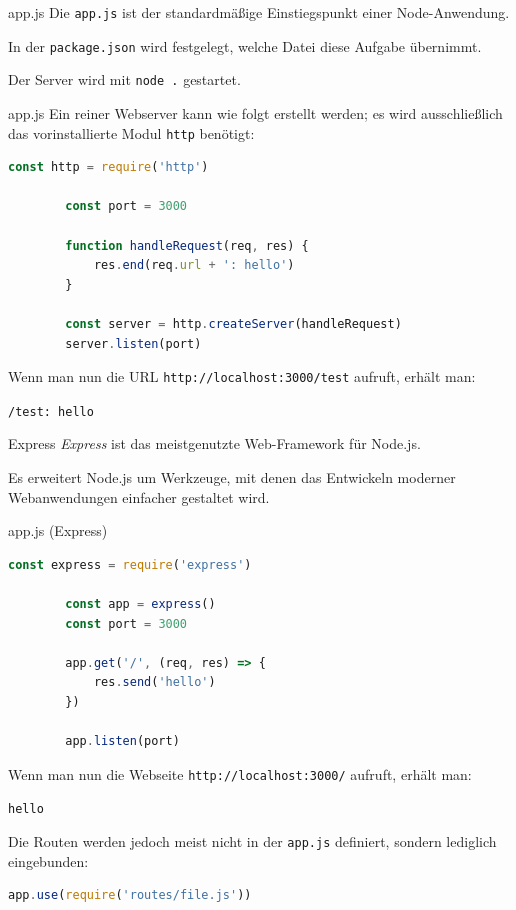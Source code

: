 \begin{bonus}{app.js}
    Die \texttt{app.js} ist der standardmäßige Einstiegspunkt einer Node-Anwendung.

    In der \texttt{package.json} wird festgelegt, welche Datei diese Aufgabe übernimmt.

    Der Server wird mit \texttt{node .} gestartet.
\end{bonus}

\begin{example}{app.js}
    Ein reiner Webserver kann wie folgt erstellt werden; es wird ausschließlich das vorinstallierte Modul \texttt{http} benötigt:

    \begin{lstlisting}[language=JavaScript]
        const http = require('http')

        const port = 3000

        function handleRequest(req, res) {
            res.end(req.url + ': hello')
        }

        const server = http.createServer(handleRequest)
        server.listen(port)
    \end{lstlisting}

    Wenn man nun die URL \texttt{http://localhost:3000/test} aufruft, erhält man:
    \begin{center}
        \texttt{/test: hello}
    \end{center}
\end{example}

\begin{defi}{Express}
    \emph{Express} ist das meistgenutzte Web-Framework für Node.js.

    Es erweitert Node.js um Werkzeuge, mit denen das Entwickeln moderner Webanwendungen einfacher gestaltet wird.
\end{defi}

\begin{example}{app.js (Express)}
    \begin{lstlisting}[language=JavaScript]
        const express = require('express')
        
        const app = express()
        const port = 3000

        app.get('/', (req, res) => {
            res.send('hello')
        })

        app.listen(port)
    \end{lstlisting}

    Wenn man nun die Webseite \texttt{http://localhost:3000/} aufruft, erhält man:
    \begin{center}
        \texttt{hello}
    \end{center}

    Die Routen werden jedoch meist nicht in der \texttt{app.js} definiert, sondern lediglich eingebunden:
    \begin{lstlisting}[language=JavaScript]
        app.use(require('routes/file.js'))
    \end{lstlisting}
\end{example}

